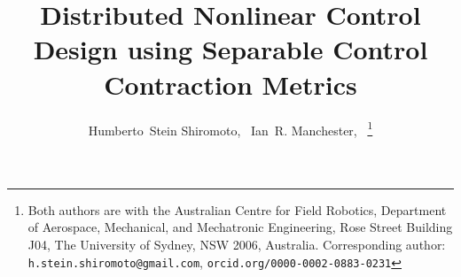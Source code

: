 \documentclass[10pt,twocolumn,twoside]{IEEEtran}
\newcounter{para}
\theoremstyle{plain}
\theoremstyle{definition}
\theoremstyle{remark}
\begin{document}
%
\title{Distributed Nonlinear Control Design using Separable Control Contraction Metrics}
%
%
%

\author{Humberto~Stein Shiromoto,~
        Ian~R. Manchester,~%
\thanks{Both authors are with the Australian Centre for Field Robotics, Department of Aerospace, Mechanical, and Mechatronic Engineering,
Rose Street Building J04, The University of Sydney, NSW 2006, Australia. Corresponding author: {\tt h.stein.shiromoto@gmail.com}, {\tt orcid.org/0000-0002-0883-0231}}%
}

% 
%



% 
\end{document}
